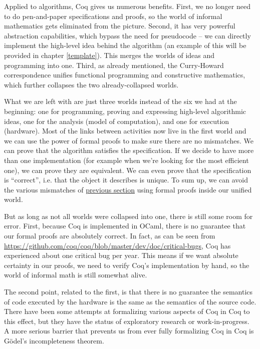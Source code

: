 \documentclass[declaration,mgr,english,shortabstract]{iithesis}
\begin{document}
Applied to algorithms, Coq gives us numerous benefits. First, we no longer need to do pen-and-paper specifications and proofs, so the world of informal mathematics gets eliminated from the picture. Second, it has very powerful abstraction capabilities, which bypass the need for pseudocode -- we can directly implement the high-level idea behind the algorithm (an example of this will be provided in chapter \ref{template}). This merges the worlds of ideas and programming into one. Third, as already mentioned, the Curry-Howard correspondence unifies functional programming and constructive mathematics, which further collapses the two already-collapsed worlds.

What we are left with are just three worlds instead of the six we had at the beginning: one for programming, proving and expressing high-level algorithmic ideas, one for the analysis (model of computation), and one for execution (hardware). Most of the links between activities now live in the first world and we can use the power of formal proofs to make sure there are no mismatches. We can prove that the algorithm satisfies the specification. If we decide to have more than one implementation (for example when we're looking for the most efficient one), we can prove they are equivalent. We can even prove that the specification is ``correct'', i.e. that the object it describes is unique. To sum up, we can avoid the various mismatches of \hyperref[worlds]{previous section} using formal proofs inside our unified world.

But as long as not all worlds were collapsed into one, there is still some room for error. First, because Coq is implemented in OCaml, there is no guarantee that our formal proofs are absolutely correct. In fact, as can be seen from \url{https://github.com/coq/coq/blob/master/dev/doc/critical-bugs}, Coq has experienced about one critical bug per year. This means if we want absolute certainty in our proofs, we need to verify Coq's implementation by hand, so the world of informal math is still somewhat alive.

The second point, related to the first, is that there is no guarantee the semantics of code executed by the hardware is the same as the semantics of the source code. There have been some attempts at formalizing various aspects of Coq in Coq \cite{CoqInCoq} \cite{CoqCoqCorrect} to this effect, but they have the status of exploratory research or work-in-progress. A more serious barrier that prevents us from ever fully formalizing Coq in Coq is G\"{o}del's incompleteness theorem.
\end{document}
